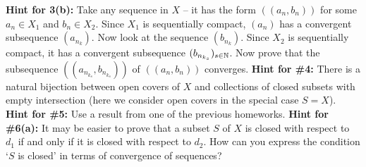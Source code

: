 \documentclass[11pt]{amsart}
\begin{document}
\newpage
{\bf Hint for 3(b):} Take any sequence in $X$ -- it has the form $((a_n,b_n))$
for some $a_n\in X_1$ and $b_n\in X_2$. Since $X_1$ is sequentially compact,
$(a_n)$ has a convergent subsequence $(a_{n_k})$. Now look at the sequence
$(b_{n_k})$. Since $X_2$ is sequentially compact, it has a convergent 
subsequence $(b_{n_{k_s}})_{s\in{\mathbb N}}$. Now prove that the subsequence
$((a_{n_{k_s}},b_{n_{k_s}}))$ of $((a_n,b_n))$ converges.
\newpage
{\bf Hint for \#4:} There is a natural bijection between open covers of $X$
and collections of closed subsets with empty intersection (here we consider open covers in the special case $S=X$).
\newpage
{\bf Hint for \#5:} Use a result from one of the previous homeworks. 
\newpage
{\bf Hint for \#6(a):} It may be easier to prove that a subset $S$ of $X$ is closed with respect to $d_1$ if and only if
it is closed with respect to $d_2$. How can you express the condition `$S$ is closed' in terms of convergence of sequences?
\end{document}
